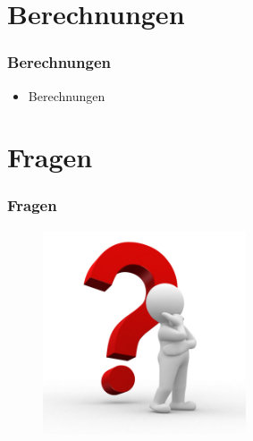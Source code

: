 \documentclass[12pt]{beamer}
\begin{document}
    \section{Berechnungen}
    \begin{frame}
        \frametitle{Berechnungen}
	    \begin{itemize}
                \item Berechnungen
            \end{itemize}
    \end{frame}

    \section{Fragen}
    \begin{frame}
    \frametitle{Fragen}
        \begin{figure}[H]
	    \centering
	        \includegraphics[width=6cm]{gfx/questionmark}
        \end{figure}
    \end{frame}
\end{document}
